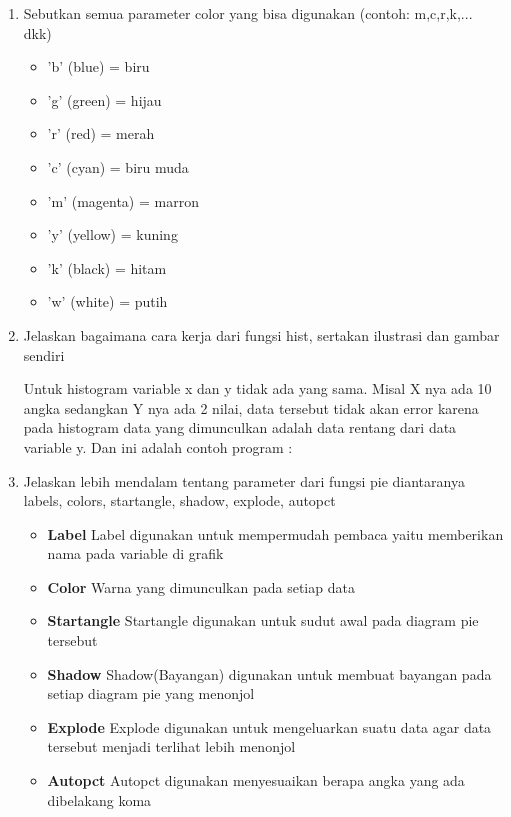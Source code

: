 \begin{enumerate}
	\item Sebutkan semua parameter color yang bisa digunakan (contoh: m,c,r,k,... dkk)
	
	\begin{itemize}
	\item 'b' (blue) = biru
	\item 'g' (green) = hijau
	\item 'r' (red) = merah
	\item 'c' (cyan) = biru muda
	\item 'm' (magenta) = marron 
	\item 'y' (yellow) = kuning
	\item 'k' (black) = hitam
	\item 'w' (white) = putih
	\end{itemize}
		
	\item Jelaskan bagaimana cara kerja dari fungsi hist, sertakan ilustrasi dan gambar sendiri		
	
	\par Untuk histogram variable x dan y tidak ada yang sama. Misal X nya ada 10 angka sedangkan Y nya ada 2 nilai, data tersebut tidak akan error karena pada histogram data yang dimunculkan adalah data rentang dari data variable y. Dan ini adalah contoh program :
	
		
	
	\item Jelaskan lebih mendalam tentang parameter dari fungsi pie diantaranya labels, colors, startangle, shadow, explode, autopct

\begin{itemize}
    \item \textbf{Label}
    Label digunakan untuk mempermudah pembaca yaitu memberikan nama pada variable di grafik

    \item \textbf{Color}
    Warna yang dimunculkan pada setiap data

    \item \textbf{Startangle}
    Startangle digunakan untuk sudut awal pada diagram pie tersebut

    \item \textbf{Shadow}
    Shadow(Bayangan) digunakan untuk membuat bayangan pada setiap diagram pie yang menonjol

    \item \textbf{Explode}
    Explode digunakan untuk mengeluarkan suatu data agar data tersebut menjadi terlihat lebih menonjol

    \item \textbf{Autopct}
    Autopct digunakan menyesuaikan berapa angka yang ada dibelakang koma
\end{itemize}
\end{enumerate}

